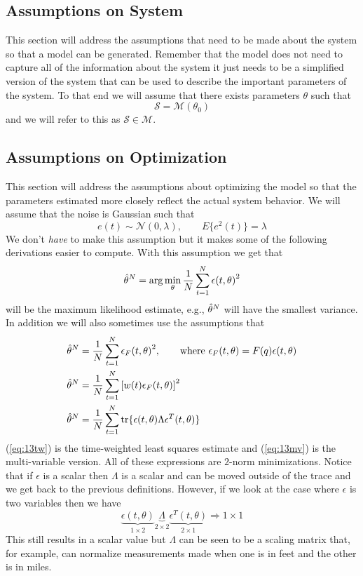 \subsection{Assumptions on System}
This section will address the assumptions that need to be made about the system so that a model can be generated.
Remember that the model does not need to capture all of the information about the system it just needs to be a simplified version of the system that can be used to describe the important parameters of the system.
To that end we will assume that there exists parameters $\theta$ such that
$$\mathcal{S}=\mathcal{M}(\theta_0)$$
and we will refer to this as $\mathcal{S}\in\mathcal{M}$.

\subsection{Assumptions on Optimization}
This section will address the assumptions about optimizing the model so that the parameters estimated more closely reflect the actual system behavior.
We will assume that the noise is Gaussian such that
$$e(t)\sim\mathcal{N}(0,\lambda), \qquad E\{e^2(t)\}=\lambda$$
We don't \textit{have} to make this assumption but it makes some of the following derivations easier to compute.
With this assumption we get that
$$\hat{\theta}^N = \arg\min_\theta \frac{1}{N}\sum_{t=1}^N \epsilon{(t,\theta)}^2$$
will be the maximum likelihood estimate, e.g., $\hat{\theta}^N$ will have the smallest variance.
In addition we will also sometimes use the assumptions that
\begin{align}
\label{eq:13filter}
\hat{\theta}^N &= \frac{1}{N}\sum_{t=1}^N\epsilon_F{(t,\theta)}^2, \qquad \text{where } \epsilon_F(t,\theta)=F(q)\epsilon(t,\theta) \\
\label{eq:13tw}
  \hat{\theta}^N &= \frac{1}{N}\sum_{t=1}^N{\left[w(t)\epsilon_F(t,\theta)\right]}^2 \\
\label{eq:13mv}
\hat{\theta}^N &= \frac{1}{N}\sum_{t=1}^N\text{tr}\{\epsilon(t,\theta)\Lambda\epsilon^T(t,\theta)\}
\end{align}
(\ref{eq:13tw}) is the time-weighted least squares estimate and (\ref{eq:13mv}) is the multi-variable version.
All of these expressions are $2$-norm minimizations.
Notice that if $\epsilon$ is a scalar then $\Lambda$ is a scalar and can be moved outside of the trace and we get back to the previous definitions.
However, if we look at the case where $\epsilon$ is two variables then we have
$$\underbrace{\epsilon(t,\theta)}_{1\times2}\underbrace{\Lambda}_{2\times2}\underbrace{\epsilon^T(t,\theta)}_{2\times1}\Rightarrow1\times1$$
This still results in a scalar value but $\Lambda$ can be seen to be a scaling matrix that, for example, can normalize measurements made when one is in feet and the other is in miles.

